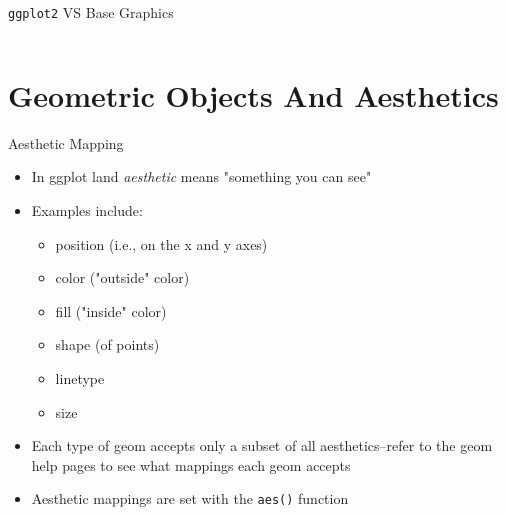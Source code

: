 \documentclass[table,smaller]{beamer}
\begin{document}
\begin{frame}[fragile,label=sec-1-9]{\texttt{ggplot2} VS Base Graphics}
\begin{columns}
\begin{column}{0.5\textwidth}
\begin{columns}
\begin{block}{}
\end{block} \end{columns}
\end{column}


\begin{column}{1.0\textwidth}

\end{column}
\end{columns}
\end{frame}

\section{Geometric Objects And Aesthetics}
\label{sec-2}

\begin{frame}[fragile,label=sec-2-1]{Aesthetic Mapping}
 \begin{itemize}
\item In ggplot land \emph{aesthetic} means "something you can see"
\item Examples include:
\begin{itemize}
\item position (i.e., on the x and y axes)
\item color ("outside" color)
\item fill ("inside" color)
\item shape (of points)
\item linetype
\item size
\end{itemize}
\item Each type of geom accepts only a subset of all aesthetics--refer to the geom help pages to see what mappings each geom accepts
\item Aesthetic mappings are set with the \texttt{aes()} function
\end{itemize}
\end{frame}
\end{document}

